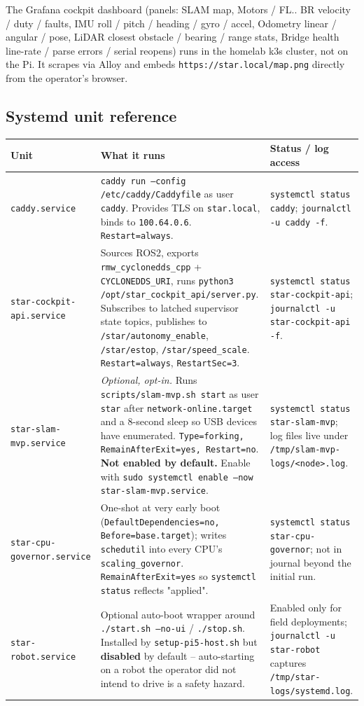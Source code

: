 The Grafana cockpit dashboard (panels: SLAM map, Motors / FL.. BR
velocity / duty / faults, IMU roll / pitch / heading / gyro / accel,
Odometry linear / angular / pose, LiDAR closest obstacle / bearing /
range stats, Bridge health line-rate / parse errors / serial reopens)
runs in the homelab k3s cluster, not on the Pi. It scrapes via Alloy
and embeds \texttt{https://star.local/map.png} directly from the
operator's browser.

\subsection{Systemd unit reference}

\begin{center}
\begin{tabular}{|p{4.4cm}|p{4.0cm}|p{6.4cm}|}
\hline
\textbf{Unit} & \textbf{What it runs} & \textbf{Status / log access} \\
\hline
\texttt{caddy.service} & \texttt{caddy run --config /etc/caddy/Caddyfile} as user \texttt{caddy}. Provides TLS on \texttt{star.local}, binds to \texttt{100.64.0.6}. \texttt{Restart=always}. & \texttt{systemctl status caddy};
\texttt{journalctl -u caddy -f}. \\
\hline
\texttt{star-cockpit-api.service} & Sources ROS2, exports
\texttt{rmw\_cyclonedds\_cpp} + \texttt{CYCLONEDDS\_URI}, runs
\texttt{python3 /opt/star\_cockpit\_api/server.py}. Subscribes
to latched supervisor state topics, publishes to
\texttt{/star/autonomy\_enable}, \texttt{/star/estop},
\texttt{/star/speed\_scale}. \texttt{Restart=always},
\texttt{RestartSec=3}. & \texttt{systemctl status star-cockpit-api};
\texttt{journalctl -u star-cockpit-api -f}. \\
\hline
\texttt{star-slam-mvp.service} & \emph{Optional, opt-in.} Runs
\texttt{scripts/slam-mvp.sh start} as user \texttt{star} after
\texttt{network-online.target} and a 8-second sleep so USB
devices have enumerated. \texttt{Type=forking,
RemainAfterExit=yes, Restart=no}. \textbf{Not enabled by
default.} Enable with \texttt{sudo systemctl enable --now
star-slam-mvp.service}. & \texttt{systemctl status star-slam-mvp};
log files live under \texttt{/tmp/slam-mvp-logs/<node>.log}. \\
\hline
\texttt{star-cpu-governor.service} & One-shot at very early boot
(\texttt{DefaultDependencies=no, Before=base.target}); writes
\texttt{schedutil} into every CPU's \texttt{scaling\_governor}.
\texttt{RemainAfterExit=yes} so \texttt{systemctl status} reflects
"applied". & \texttt{systemctl status star-cpu-governor}; not in
journal beyond the initial run. \\
\hline
\texttt{star-robot.service} & Optional auto-boot wrapper around
\texttt{./start.sh --no-ui} / \texttt{./stop.sh}. Installed by
\texttt{setup-pi5-host.sh} but \textbf{disabled} by default --
auto-starting on a robot the operator did not intend to drive is
a safety hazard. & Enabled only for field deployments;
\texttt{journalctl -u star-robot} captures
\texttt{/tmp/star-logs/systemd.log}. \\
\hline
\end{tabular}
\end{center}

